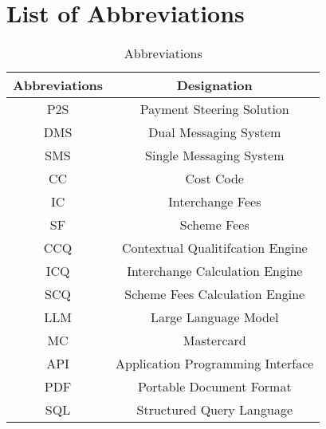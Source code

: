 \section*{List of Abbreviations}
\begin{table}[H]
\centering
\begin{tabular}{|c|c|}
\hline
\textbf{Abbreviations} & \textbf{Designation} \\
\hline
P2S & Payment Steering Solution \\
\hline
DMS & Dual Messaging System \\
\hline
SMS & Single Messaging System \\
\hline
CC & Cost Code \\
\hline
IC & Interchange Fees \\
\hline
SF & Scheme Fees \\
\hline
CCQ & Contextual Qualitifcation Engine \\
\hline
ICQ & Interchange Calculation Engine \\
\hline
SCQ & Scheme Fees Calculation Engine \\
\hline
LLM & Large Language Model \\
\hline
MC & Mastercard \\
\hline
API & Application Programming Interface \\
\hline
PDF & Portable Document Format \\
\hline
SQL & Structured Query Language \\
\hline
\end{tabular}
\caption{Abbreviations}
\label{tab:Abbreviations}
\end{table}